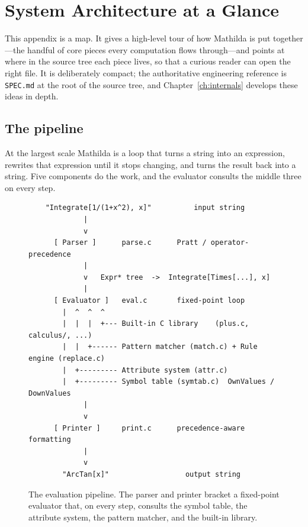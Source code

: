 \chapter{System Architecture at a Glance}
\label{app:architecture}

This appendix is a map. It gives a high-level tour of how Mathilda is put
together---the handful of core pieces every computation flows through---and points
at where in the source tree each piece lives, so that a curious reader can open the
right file. It is deliberately compact; the authoritative engineering reference is
\texttt{SPEC.md} at the root of the source tree, and Chapter~\ref{ch:internals}
develops these ideas in depth.

\section{The pipeline}
\label{app:pipeline}

At the largest scale Mathilda is a loop that turns a string into an expression,
rewrites that expression until it stops changing, and turns the result back into a
string. Five components do the work, and the evaluator consults the middle three on
every step.

\begin{figure}[h]
\begin{framed}
\small
\begin{verbatim}
    "Integrate[1/(1+x^2), x]"          input string
             |
             v
      [ Parser ]      parse.c      Pratt / operator-precedence
             |
             v   Expr* tree  ->  Integrate[Times[...], x]
             |
      [ Evaluator ]   eval.c       fixed-point loop
        |  ^  ^  ^
        |  |  |  +--- Built-in C library    (plus.c, calculus/, ...)
        |  |  +------ Pattern matcher (match.c) + Rule engine (replace.c)
        |  +--------- Attribute system (attr.c)
        |  +--------- Symbol table (symtab.c)  OwnValues / DownValues
             |
             v
      [ Printer ]     print.c      precedence-aware formatting
             |
             v
        "ArcTan[x]"                  output string
\end{verbatim}
\end{framed}
\caption{The evaluation pipeline. The parser and printer bracket a fixed-point
evaluator that, on every step, consults the symbol table, the attribute system,
the pattern matcher, and the built-in library.}
\label{fig:pipeline}
\end{figure}

